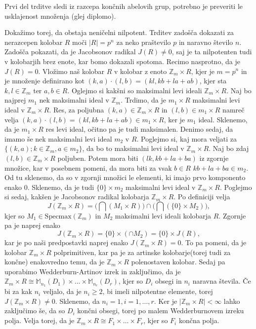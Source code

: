 \documentclass[a4paper, 12pt]{amsart}
\theoremstyle{definition} %
\theoremstyle{plain} %
\newcommand{\Z}{\mathbb Z}
\newcommand{\M}{\mathbb M}
\begin{document}
\proof
Prvi del trditve sledi iz razcepa končnih abelovih grup, potrebno je preveriti le usklajenost množenja (glej diplomo). 

Dokažimo torej, da obstaja neničelni nilpotent. Trditev zadošča dokazati za nerazcepen kolobar $R$ moči $|R|=p^n$ za neko praštevilo $p$ in naravno število $n$. Zadošča pokazati, da je Jacobsonov radikal $J(R)\neq 0$, saj je ta nilpotenten tudi v kolobarjih brez enote, kar bomo dokazali spotoma. Recimo nasprotno, da je $J(R) = 0$. Vložimo naš kolobar $R$ v kolobar z enoto $\Z_m \times R$, kjer je $m=p^n$ in je množenje definirano kot $(k,a)\cdot (l,b) = (kl,kb+la+ab)$, kjer sta $k,l\in \Z_m$ ter $a,b\in R$. Oglejmo si kakšni so maksimalni levi ideali $\Z_m \times R$. Naj bo najprej $m_1$ nek maksimalni ideal v $\Z_m$. Trdimo, da je $m_1\times R$ maksimalni levi ideal v $\Z_m \times R$. Res, za poljubna $(k,a)\in \Z_m \times R$ in $(l,b)\in m_1 \times R$ namreč velja $(k,a)\cdot (l,b) = (kl, kb+ la+ab)\in m_1 \times R$, ker je $m_1$ ideal. Sklenemo, da je $m_1\times R$ res levi ideal, očitno pa je tudi maksimalen. Denimo sedaj, da imamo še nek maksimalni levi ideal $m_2$ v $R$. Poglejmo si, kaj mora veljati za $\{(k,a); k\in \Z_m, a\in m_2\}$, da bo to maksimalni levi ideal v $\Z_m\times R$. Naj bo zdaj $(l,b)\in \Z_m \times R$ poljuben. Potem mora biti $(lk, kb+la+ba)$ iz zgornje množice, kar v posebnem pomeni, da mora biti za vsak $b\in R$ $kb+la+ba\in m_2$. Od tu sklenemo, da so v zgornji množici le elementi, ki imajo prvo komponento enako 0. Sklenemo, da je tudi $\{0\}\times m_2$ maksimalni levi ideal v $\Z_m \times R$. Poglejmo si sedaj, kakšen je Jacobsonov radikal kolobarja $\Z_m\times R$. Po definiciji velja
$$
J(\Z_m\times R) = \big(\bigcap (M_1\times R)\big) \cap\big (\bigcap (\{0\}\times M_2)\big),
$$
kjer so $M_1\in \text{Specmax}(\Z_m)$ in $M_2$ maksimalni levi ideali kolobarja $R$. Zgornje pa je naprej enako
$$
J(\Z_m \times R) = \{0\}\times (\cap M_2) = \{0 \} \times J(R),
$$
kar je po naši predpostavki naprej enako $J(\Z_m\times R) = 0$. To pa pomeni, da je kolobar $\Z_m\times R$ polprimitiven, kar pa je za artinske kolobarje(torej tudi za končne) enakovredno temu, da je $\Z_m \times R$ polenostaven kolobar. Sedaj pa uporabimo Wedderburn-Artinov izrek in zaključimo, da je $\Z_m \times R \cong \M_{n_1} (D_1)\times \dots \times\M_{n_r}(D_r)$, kjer so $D_i$ obsegi in $n_i$ naravna števila. Če bi za kak $n_i$ veljalo, da je $n_i\ge 2$, bi imeli nilpotentne elemente, torej $J(\Z_m\times R) \neq 0$. Sklenemo, da $n_i = 1, i=1,\dots,r$. Ker je $|\Z_m\times R|<\infty$ lahko zaključimo še, da so $D_i$ končni obsegi, torej po malem Wedderburnovem izreku polja. Velja torej, da je $\Z_m \times R \cong F_1 \times \dots \times F_r$, kjer so $F_i$ končna polja. 
\end{document}
